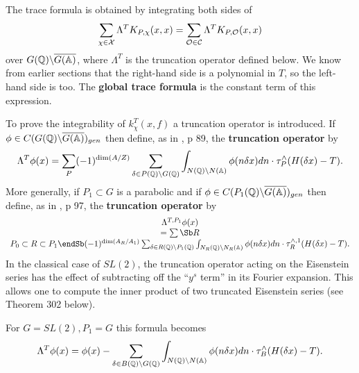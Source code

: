 The trace formula is obtained by integrating both sides of 
\[
\sum_{\chi \in \mathcal{X}}\Lambda ^TK_{P,\chi }(x,x)
=\sum_{{\cal O}\in \mathcal{C}}
\Lambda ^TK_{P,{\cal O}}(x,x) 
\]
over $G({\Bbb{Q}})\backslash \overline{G({\Bbb{A}})}$,
where $\Lambda ^T$ is the
truncation operator defined below. We know from earlier sections that the
right-hand side is a polynomial in $T$, so the left-hand side is too. The 
\textbf{global trace formula} is the constant term of this expression. 

To prove the integrability of $k_\chi ^T(x,f)$ a truncation operator is
introduced.
If $\phi \in C(G({\Bbb{Q}})\backslash \overline{G({\Bbb{A}})})_{gen}$
then define,
as in \cite{A3}, p 89, the \textbf{truncation operator} by 
\begin{equation}
\Lambda ^T\phi (x)
=\sum_P(-1)^{\dim (A/Z)}
\sum_{\delta \in P({\Bbb{Q}})\backslash G({\Bbb{Q}})}
\int_{N({\Bbb{Q}})\backslash N({\Bbb{A}})}\phi (n\delta
x)dn\cdot \tau _P^{\wedge }(H(\delta x)-T).
\end{equation}
More generally, if $P_1\subset G$ is a parabolic and if
$\phi \in C(P_1({\Bbb{Q}})\backslash \overline{G({\Bbb{A}})})_{gen}$ then
define, as in \cite{A3}, p 97, the \textbf{truncation operator} by 
\begin{equation}
\begin{array}{c}
\Lambda ^{T,P_1}\phi (x)\\
=\sum\Sb R  \\ P_0\subset R\subset P_1  \endSb 
(-1)^{\dim (A_R/A_1)}
\sum_{\delta \in R({\Bbb{Q}})\backslash P_1({\Bbb{Q}})}
\int_{N_R({\Bbb{Q}})\backslash N_R({\Bbb{A}})}
\phi (n\delta x)dn\cdot \tau_R^{\wedge ,1}(H(\delta x)-T).
\end{array}
\end{equation}
In the classical case of $SL(2)$, the truncation operator acting
on the Eisenstein series has the effect of subtracting
off the ``$y^s$ term'' in its Fourier expansion. This allows one 
to compute the inner product of two truncated Eisenstein series
(see Theorem 302 below).

\begin{example}
For $G=SL(2),P_1=G$ this formula becomes 
\begin{equation}
\Lambda ^T\phi (x)
=\phi (x)-\sum_{\delta \in B({\Bbb{Q}})\backslash G({\Bbb{Q}})}
\int_{N({\Bbb{Q}})\backslash N({\Bbb{A}})}\phi (n\delta x)dn
\cdot \tau_B^{\wedge }(H(\delta x)-T).
\end{equation}
\end{example}

